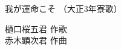 \documentclass[10pt,b5j]{tarticle} %
\begin{document}
\begin{minipage}[c]{0.7\hsize} %
    \begin{center}
        {\LARGE
            我が運命こそ %
        }
        {\small 
            （大正3年寮歌） %
        }
    \end{center}
\end{minipage}
\begin{minipage}[c]{0.3\hsize} %
    \begin{flushright} %
        樋口桜五君 作歌\\赤木顕次君 作曲 %
    \end{flushright}
\end{minipage}
\end{document}
